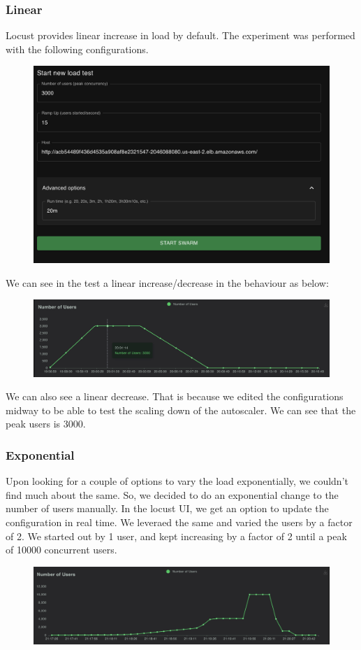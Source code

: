 \documentclass{article}
\begin{document}
\subsubsection{Linear}
Locust provides linear increase in load by default. The experiment was performed with the following configurations. 
\begin{figure}[H]
    \centering
    \includegraphics[width=0.75\linewidth]{images/locust_linear.png}
\end{figure}
We can see in the test a linear increase/decrease in the behaviour as below:
\begin{figure}[H]
    \centering
    \includegraphics[width=0.9\linewidth]{images/users_linear.png}
\end{figure}
We can also see a linear decrease. That is because we edited the configurations midway to be able to test the scaling down of the autoscaler. We can see that the peak users is 3000.
\subsubsection{Exponential}
Upon looking for a couple of options to vary the load exponentially, we couldn't find much about the same. So, we decided to do an exponential change to the number of users manually. In the locust UI, we get an option to update the configuration in real time. We leveraed the same and varied the users by a factor of 2. We started out by 1 user, and kept increasing by a factor of 2 until a peak of 10000 concurrent users.
\begin{figure}[H]
    \centering
    \includegraphics[width=0.9\linewidth]{images/users_exponential.png}
\end{figure}
\end{document}
